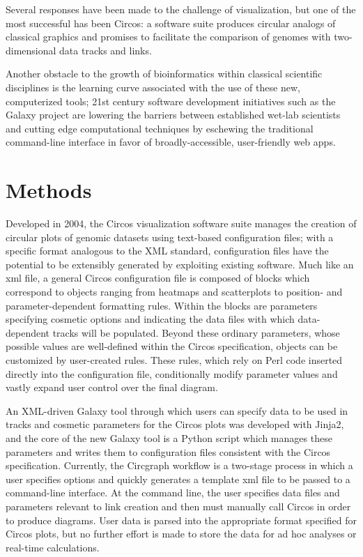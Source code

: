 \documentclass{article}
\begin{document}
Several responses have been made to the challenge of visualization, but one of the most successful has been Circos: a software suite produces circular analogs of classical graphics and promises to facilitate the comparison of genomes with two-dimensional data tracks and links.

Another obstacle to the growth of bioinformatics within classical scientific disciplines is the learning curve associated with the use of these new, computerized tools; 21st century software development initiatives such as the Galaxy project are lowering the barriers between established wet-lab scientists and cutting edge computational techniques by eschewing the traditional command-line interface in favor of broadly-accessible, user-friendly web apps.


\section*{Methods}
Developed in 2004, the Circos visualization software suite manages the creation of circular plots of genomic datasets using text-based configuration files; with a specific format analogous to the XML standard, configuration files have the potential to be extensibly generated by exploiting existing software. Much like an xml file, a general Circos configuration file is composed of blocks which correspond to objects ranging from heatmaps and scatterplots to position- and parameter-dependent formatting rules. Within the blocks are parameters specifying cosmetic options and indicating the data files with which data-dependent tracks will be populated. Beyond these ordinary parameters, whose possible values are well-defined within the Circos specification, objects can be customized by user-created rules. These rules, which rely on Perl code inserted directly into the configuration file, conditionally modify parameter values and vastly expand user control over the final diagram.  

An XML-driven Galaxy tool through which users can specify data to be used in tracks and cosmetic parameters for the Circos plots was developed with Jinja2, and the core of the new Galaxy tool is a Python script which manages these parameters and writes them to configuration files consistent with the Circos specification. Currently, the Circgraph workflow is a two-stage process in which a user specifies options and quickly generates a template xml file to be passed to a command-line interface. At the command line, the user specifies data files and parameters relevant to link creation and then must manually call Circos in order to produce diagrams. User data is parsed into the appropriate format specified for Circos plots, but no further effort is made to store the data for ad hoc analyses or real-time calculations.
\end{document}
